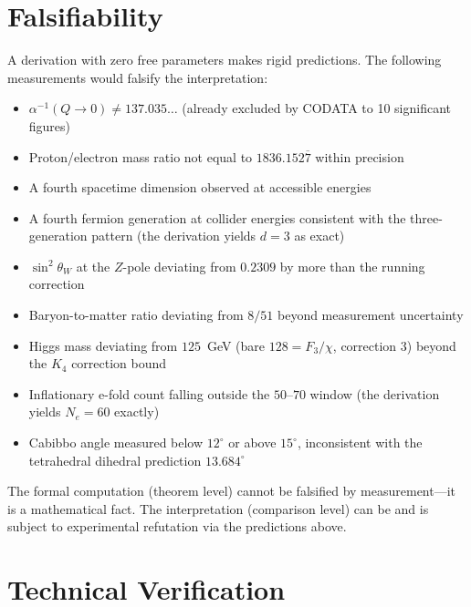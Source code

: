 \documentclass[11pt,a4paper]{article}
\theoremstyle{definition}
\begin{document}
\section{Falsifiability}
\label{sec:falsifiability}

A derivation with zero free parameters makes rigid predictions.  The following
measurements would falsify the interpretation:

\begin{itemize}[nosep, leftmargin=1.4em]
\item $\alpha^{-1}(Q \to 0) \ne 137.035\ldots$ (already excluded by CODATA
  to 10 significant figures)
\item Proton/electron mass ratio not equal to $1836.152\overline{7}$ within
  precision
\item A fourth spacetime dimension observed at accessible energies
\item A fourth fermion generation at collider energies consistent with the
  three-generation pattern (the derivation yields $d = 3$ as exact)
\item $\sin^2\theta_W$ at the $Z$-pole deviating from $0.2309$ by more than
  the running correction
\item Baryon-to-matter ratio deviating from $8/51$ beyond measurement
  uncertainty
\item Higgs mass deviating from $125$~GeV (bare $128 = F_3/\chi$, correction $3$)
  beyond the $K_4$ correction bound
\item Inflationary e-fold count falling outside the $50$--$70$ window (the
  derivation yields $N_e = 60$ exactly)
\item Cabibbo angle measured below $12^\circ$ or above $15^\circ$, inconsistent
  with the tetrahedral dihedral prediction $13.684^\circ$
\end{itemize}

\noindent The formal computation (theorem level) cannot be falsified by
measurement---it is a mathematical fact.  The interpretation (comparison
level) can be and is subject to experimental refutation via the predictions
above.

\section{Technical Verification}
\label{sec:technical}
\end{document}
